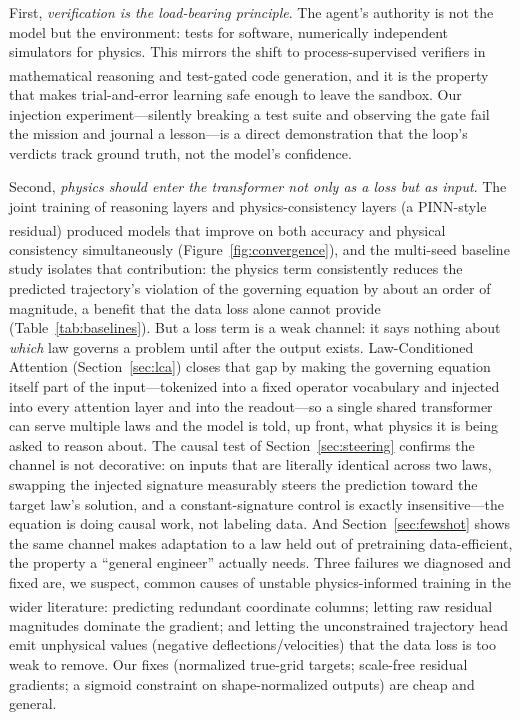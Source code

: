 \documentclass[11pt,a4paper]{article}
\newcommand{\pn}{\textsuperscript}
\begin{document}
First, \emph{verification is the load-bearing principle}. The agent's
authority is not the model but the environment: tests for software,
numerically independent simulators for physics. This mirrors the shift to
process-supervised verifiers in mathematical reasoning\pn{\citep{lightman2024}}
and test-gated code generation\pn{\citep{li2022,jimenez2024}}, and it is the
property that makes trial-and-error learning safe enough to leave the
sandbox. Our injection experiment---silently breaking a test suite and
observing the gate fail the mission and journal a lesson---is a direct
demonstration that the loop's verdicts track ground truth, not the model's
confidence.

Second, \emph{physics should enter the transformer not only as a loss but as
input}. The joint training of reasoning layers and physics-consistency
layers (a PINN-style residual\pn{\citep{raissi2019}}) produced models that
improve on both accuracy and physical consistency simultaneously
(Figure~\ref{fig:convergence}), and the multi-seed baseline study isolates
that contribution: the physics term consistently reduces the predicted
trajectory's violation of the governing equation by about an order of
magnitude, a benefit that the data loss alone cannot provide
(Table~\ref{tab:baselines}). But a loss term is a weak channel: it says
nothing about \emph{which} law governs a problem until after the output
exists. Law-Conditioned Attention (Section~\ref{sec:lca}) closes that gap
by making the governing equation itself part of the input---tokenized into
a fixed operator vocabulary and injected into every attention layer and
into the readout---so a single shared transformer can serve multiple laws
and the model is told, up front, what physics it is being asked to reason
about. The causal test of Section~\ref{sec:steering} confirms the channel
is not decorative: on inputs that are literally identical across two laws,
swapping the injected signature measurably steers the prediction toward
the target law's solution, and a constant-signature control is exactly
insensitive---the equation is doing causal work, not labeling data. And
Section~\ref{sec:fewshot} shows the same channel makes adaptation to a law
held out of pretraining data-efficient, the property a ``general
engineer'' actually needs. Three failures we diagnosed and fixed are, we
suspect, common causes of unstable physics-informed training in the wider
literature\pn{\citep{wang2021}}: predicting redundant coordinate columns;
letting raw residual magnitudes dominate the gradient; and letting the
unconstrained trajectory head emit unphysical values (negative
deflections/velocities) that the data loss is too weak to remove. Our fixes
(normalized true-grid targets; scale-free residual gradients; a sigmoid
constraint on shape-normalized outputs) are cheap and general.
\end{document}

